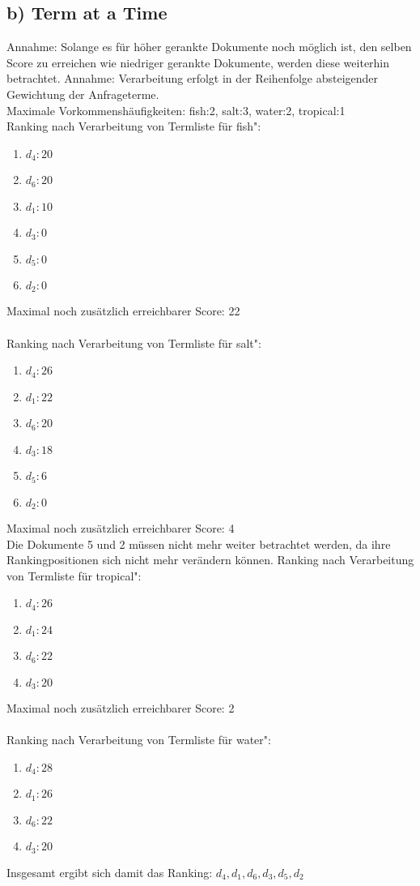 \subsection*{b) Term at a Time}
Annahme: Solange es für höher gerankte Dokumente noch möglich ist, den selben Score zu erreichen wie niedriger gerankte Dokumente, werden diese weiterhin betrachtet.
Annahme: Verarbeitung erfolgt in der Reihenfolge absteigender Gewichtung der Anfrageterme. \\
Maximale Vorkommenshäufigkeiten: fish:2, salt:3, water:2, tropical:1
\ \\
Ranking nach Verarbeitung von Termliste für \glqq fish":
\begin{enumerate}
\item $d_{4}:20$
\item $d_{6}:20$
\item $d_{1}:10$
\item $d_{3}:0$
\item $d_{5}:0$
\item $d_{2}:0$
\end{enumerate}
Maximal noch zusätzlich erreichbarer Score: 22\\
\ \\
Ranking nach Verarbeitung von Termliste für  \glqq salt":
\begin{enumerate}
\item $d_{4}:26$
\item $d_{1}:22$
\item $d_{6}:20$
\item $d_{3}:18$
\item $d_{5}:6$
\item $d_{2}:0$
\end{enumerate}
Maximal noch zusätzlich erreichbarer Score: 4\\
Die Dokumente 5 und 2 müssen nicht mehr weiter betrachtet werden, da ihre Rankingpositionen sich nicht mehr verändern können. 
\newpage
Ranking nach Verarbeitung von Termliste für  \glqq tropical":
\begin{enumerate}
\item $d_{4}:26$
\item $d_{1}:24$
\item $d_{6}:22$
\item $d_{3}:20$
\end{enumerate}
Maximal noch zusätzlich erreichbarer Score: 2\\
\ \\
Ranking nach Verarbeitung von Termliste für  \glqq water":
\begin{enumerate}
\item $d_{4}:28$
\item $d_{1}:26$
\item $d_{6}:22$
\item $d_{3}:20$
\end{enumerate}
Insgesamt ergibt sich damit das Ranking: $d_{4}, d_{1}, d_{6}, d_{3}, d_{5}, d_{2}$